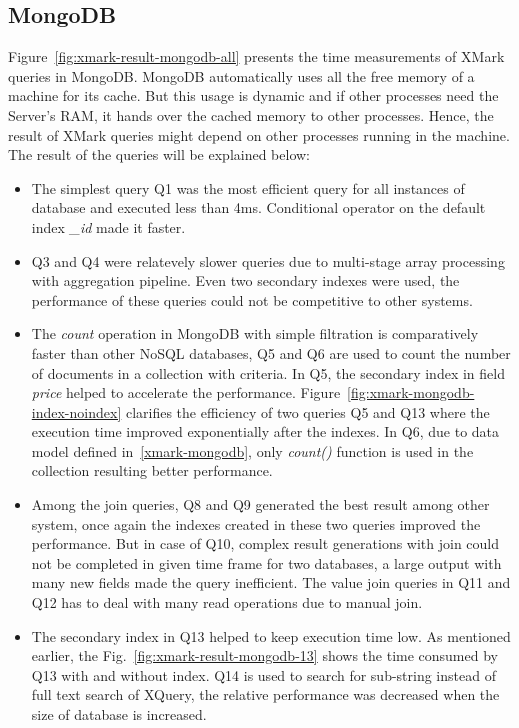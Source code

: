 \subsection{MongoDB}
Figure~\ref{fig:xmark-result-mongodb-all} presents the time measurements of XMark queries in MongoDB. MongoDB automatically uses all the free memory of a machine for its cache. But this usage is dynamic and if other processes need the Server's RAM, it hands over the cached memory to other processes. Hence, the result of XMark queries might depend on other processes running in the machine.  The result of the queries will be explained below:
\begin{itemize}
\item The simplest query Q1 was the most efficient query for all instances of database and executed less than 4ms. Conditional operator on the default index \textit{\_id} made it faster.
\item Q3 and Q4 were relatevely slower queries due to multi-stage array processing with aggregation pipeline. Even two secondary indexes were used, the performance of these queries could not be competitive to other systems. 
\item The \textit{count} operation in MongoDB with simple filtration is comparatively faster than other NoSQL databases, Q5 and Q6 are used to count the number of documents in a collection with criteria. In Q5, the secondary index in field \textit{price}  helped to accelerate the performance. Figure~\ref{fig:xmark-mongodb-index-noindex} clarifies the efficiency of two queries Q5 and Q13 where the execution time improved exponentially after the indexes. In Q6, due to data model defined in~\ref{xmark-mongodb}, only \textit{count()} function is used in the collection resulting better performance.

\item Among the join queries, Q8 and Q9 generated the best result among other system, once again the indexes created in these two queries improved the performance. 
But in case of Q10, complex result generations with join could not be completed in given time frame for two databases, a large output with many new fields made the query inefficient. The value join queries in Q11 and Q12 has to deal with many read operations due to manual join.

\item The secondary index in Q13 helped to keep execution time low. As mentioned earlier, the Fig.~\ref{fig:xmark-result-mongodb-13} shows the time consumed by Q13  with and without index. Q14 is used to search for sub-string instead of full text search of XQuery, the relative performance was decreased when the size of database is increased.


\end{itemize}
